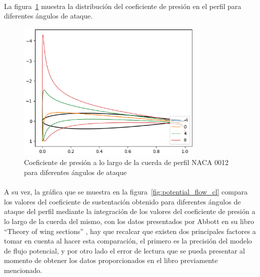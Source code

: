 \documentclass[letterpaper, openright, 12pt]{book}
\begin{document}
    \paragraph*{}
    La figura~\ref{fig:potential_flow_cp_dist} muestra la distribución del
    coeficiente de presión en el perfil para diferentes ángulos de ataque.
    \begin{figure}[htbp!]
        \centering
        \includegraphics[keepaspectratio,
            width=0.8\textwidth]{./img/potential_flow_cps}
        \caption[Coeficiente de presión a lo largo de la cuerda de perfil
        NACA 0012]
        {Coeficiente de presión a lo largo de la cuerda de perfil NACA 0012
        para diferentes ángulos de ataque}\label{fig:potential_flow_cp_dist}
    \end{figure}

    \paragraph*{}
    A su vez, la gráfica que se muestra en la
    figura~\ref{fig:potential_flow_cl} compara los valores del coeficiente de
    sustentación obtenido para diferentes ángulos de ataque del perfil
    mediante la integración de los valores del coeficiente de presión a lo
    largo de la cuerda del mismo, con los datos presentados por Abbott en su
    libro ``Theory of wing sections'' \cite{abbott}, hay que recalcar que
    existen dos principales factores a tomar en cuenta al hacer esta
    comparación, el primero es la precisión del modelo de flujo potencial, y
    por otro lado el error de lectura que se pueda presentar al momento de
    obtener los datos proporcionados en el libro previamente mencionado.
\end{document}
